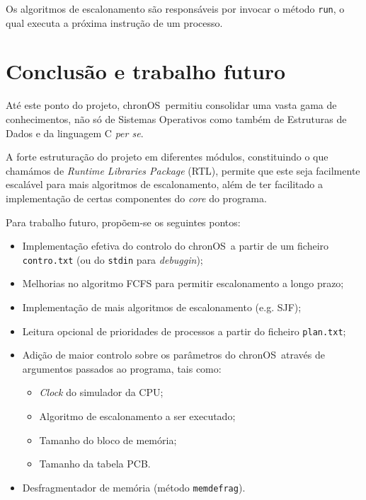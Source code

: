 \documentclass[a4paper,11pt,onecolumn,oneside]{article}
\newcommand{\chronOS}{\textsf{chronOS}}
\begin{document}
	Os algoritmos de escalonamento são responsáveis por invocar o método \verb|run|, o qual executa a próxima instrução de um processo.
	
	
	\section{Conclusão e trabalho futuro}
	\label{sec:con_futwork}
	
	Até este ponto do projeto, \chronOS~permitiu consolidar uma vasta gama de conhecimentos, não só de Sistemas Operativos como também de Estruturas de Dados e da linguagem C \textit{per se}.
	
	A forte estruturação do projeto em diferentes módulos, constituindo o que chamámos de \textit{Runtime Libraries Package} (RTL), permite que este seja facilmente escalável para mais algoritmos de escalonamento, além de ter facilitado a implementação de certas componentes do \textit{core} do programa.
	
	\vspace{0.6cm}
	
	Para trabalho futuro, propõem-se os seguintes pontos:
	
	\begin{itemize}
		\item Implementação efetiva do controlo do \chronOS~a partir de um ficheiro \texttt{contro.txt} (ou do \texttt{stdin} para \textit{debuggin});
		\item Melhorias no algoritmo FCFS para permitir escalonamento a longo prazo;
		\item Implementação de mais algoritmos de escalonamento (e.g. \ac{SJF});
		\item Leitura opcional de prioridades de processos a partir do ficheiro \texttt{plan.txt};
		\item Adição de maior controlo sobre os parâmetros do \chronOS~através de argumentos passados ao programa, tais como:
		\begin{itemize}
			\item \textit{Clock} do simulador da CPU;
			\item Algoritmo de escalonamento a ser executado;
			\item Tamanho do bloco de memória;
			\item Tamanho da tabela PCB.
		\end{itemize}
	
		\item Desfragmentador de memória (método \verb|memdefrag|).
	\end{itemize}
	
\end{document}
